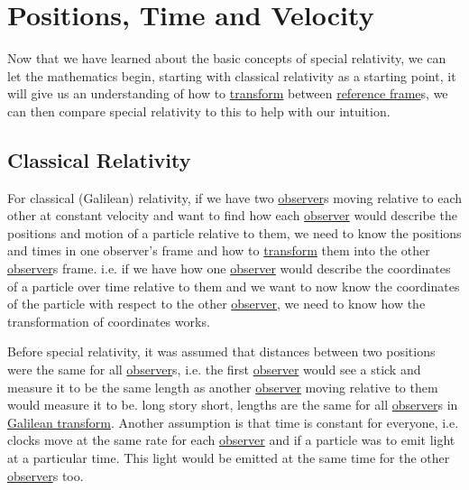 \chapter{Positions, Time and Velocity} %

Now that we have learned about the basic concepts of special relativity, we can let the mathematics begin, starting with classical relativity as a starting point, it will give us an understanding of how to \hyperlink{def-transform}{transform} between \hyperlink{def-Reference-frame}{reference frame}s, we can then compare special relativity to this to help with our intuition.

\section{Classical Relativity}

For classical (Galilean) relativity, if we have two \hyperlink{def-observer}{observer}s moving relative to each other at constant velocity and want to find how each \hyperlink{def-observer}{observer} would describe the positions and motion of a particle relative to them, we need to know the positions and times in one observer's frame and how to \hyperlink{def-transform}{transform} them into the other \hyperlink{def-observer}{observer}s frame. i.e. if we have how one \hyperlink{def-observer}{observer} would describe the coordinates of a particle over time relative to them and we want to now know the coordinates of the particle with respect to the other \hyperlink{def-observer}{observer}, we need to know how the transformation of coordinates works.

Before special relativity, it was assumed that distances between two positions were the same for all \hyperlink{def-observer}{observer}s, i.e. the first \hyperlink{def-observer}{observer} would see a stick and measure it to be the same length as another \hyperlink{def-observer}{observer} moving relative to them would measure it to be. long story short, lengths are the same for all \hyperlink{def-observer}{observer}s in \hyperlink{def-galilean-transform}{Galilean transform}. Another assumption is that time is constant for everyone, i.e. clocks move at the same rate for each \hyperlink{def-observer}{observer} and if a particle was to emit light at a particular time. This light would be emitted at the same time for the other \hyperlink{def-observer}{observer}s too.

